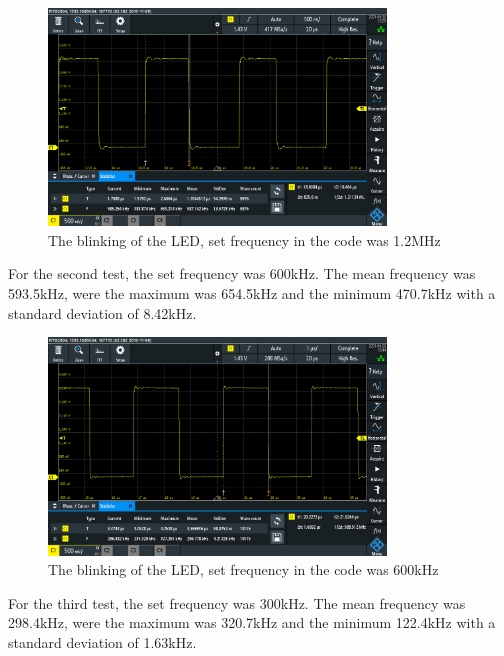 \begin{figure}[h]
    \centering
    \includegraphics[width=0.8\textwidth]{graphics/STAT01_1200.PNG}
    \caption{The blinking of the LED, set frequency in the code was 1.2MHz}
    \label{fig:PDBSp1200}
\end{figure}

For the second test, the set frequency was 600kHz.
The mean frequency was 593.5kHz, were the maximum was 654.5kHz and the minimum 470.7kHz with a standard deviation of 8.42kHz. 

\begin{figure}[h]
    \centering
    \includegraphics[width=0.8\textwidth]{graphics/STAT02_600.PNG}
    \caption{The blinking of the LED, set frequency in the code was 600kHz}
    \label{fig:PDBSp600}
\end{figure}

For the third test, the set frequency was 300kHz.
The mean frequency was 298.4kHz, were the maximum was 320.7kHz and the minimum
122.4kHz with a standard deviation of 1.63kHz. 


